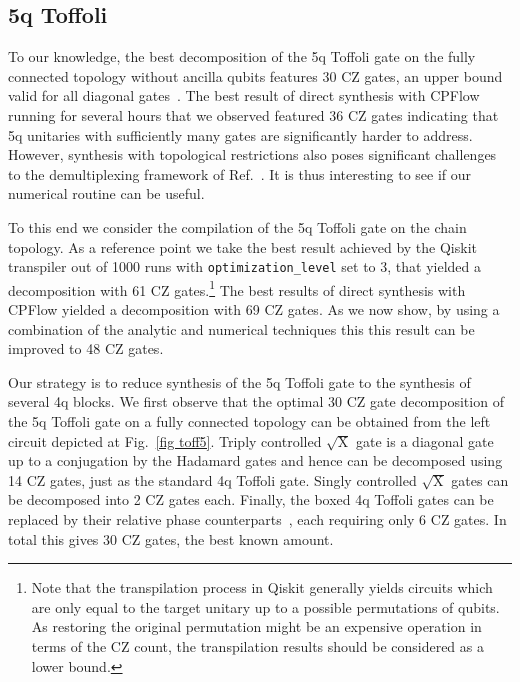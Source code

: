 \documentclass[twocolumn, amsfonts, amssymb, aps, nofootinbib]{revtex4-2}
\newcommand{\CZ}{\textsf{CZ }}
\newcommand{\package}[1]{\textrm {#1 }}
\newcommand{\cpflow}{\package{CPFlow}}
\newcommand{\param}[1]{\texttt{#1}}
\begin{document}
\subsection{5q Toffoli \label{sec toff5}}

To our knowledge, the best decomposition of the 5q Toffoli gate on the fully connected topology without ancilla qubits features $30$ \CZ gates, an upper bound valid for all diagonal gates~\cite{Shende2006}. The best result of direct synthesis with \cpflow running for several hours that we observed featured 36 \CZ gates indicating that 5q unitaries with sufficiently many gates are significantly harder to address. However, synthesis with topological restrictions also poses significant challenges to the demultiplexing framework of Ref.~\cite{Shende2006}. It is thus interesting to see if our numerical routine can be useful.

To this end we consider the compilation of the 5q Toffoli gate on the chain topology. As a reference point we take the best result achieved by the \package{Qiskit} transpiler out of 1000 runs with \param{optimization\_level} set to 3, that yielded a decomposition with 61 \CZ gates.\footnote{Note that the transpilation process in \package{Qiskit} generally yields circuits which are only equal to the target unitary up to a possible permutations of qubits. As restoring the original permutation might be an expensive operation in terms of the \CZ count, the transpilation results should be considered as a lower bound.} The best results of direct synthesis with \cpflow yielded a decomposition with 69 \CZ gates. As we now show, by using a combination of the analytic and numerical techniques this this result can be improved to 48 \CZ gates.

Our strategy is to reduce synthesis of the 5q Toffoli gate to the synthesis of several 4q blocks. We first observe that the optimal 30 \CZ gate decomposition of the 5q Toffoli gate on a fully connected topology can be obtained from the left circuit depicted at Fig.~\ref{fig toff5}. Triply controlled $\sqrt{\text{X}}$ gate is a diagonal gate up to a conjugation by the Hadamard gates and hence can be decomposed using 14 \CZ gates, just as the standard 4q Toffoli gate. Singly controlled $\sqrt{\text{X}}$ gates can be decomposed into 2 \CZ gates each. Finally, the boxed 4q Toffoli gates can be replaced by their relative phase counterparts~\cite{Maslov}, each requiring only 6 \CZ gates. In total this gives 30 \CZ gates, the best known amount.
\end{document}
